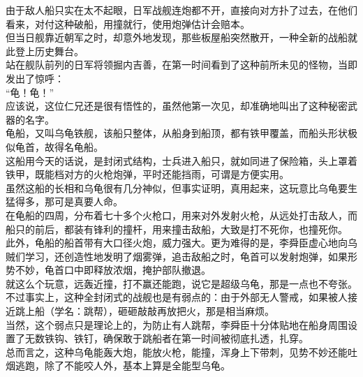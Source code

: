 \begin{multicols}{\theparacolNo}
由于敌人船只实在太不起眼，日军战舰连炮都不开，直接向对方扑了过去，在他们看来，对付这种破船，用撞就行，使用炮弹估计会赔本。\\

但当日舰靠近朝军之时，却意外地发现，那些板屋船突然散开，一种全新的战船就此登上历史舞台。\\

站在舰队前列的日军将领掘内吉善，在第一时间看到了这种前所未见的怪物，当即发出了惊呼：\\

“龟！龟！”\\

应该说，这位仁兄还是很有悟性的，虽然他第一次见，却准确地叫出了这种秘密武器的名字。\\

龟船，又叫乌龟铁舰，该船只整体，从船身到船顶，都有铁甲覆盖，而船头形状极似龟首，故得名龟船。\\

这船用今天的话说，是封闭式结构，士兵进入船只，就如同进了保险箱，头上罩着铁甲，既能档对方的火枪炮弹，平时还能挡雨，可谓是方便实用。\\

虽然这船的长相和乌龟很有几分神似，但事实证明，真用起来，这玩意比乌龟要生猛得多，那可是真要人命。\\

在龟船的四周，分布着七十多个火枪口，用来对外发射火枪，从远处打击敌人，而船只的前后，都装有锋利的撞杆，用来撞击敌船，大致是打不死你，也撞死你。\\

此外，龟船的船首带有大口径火炮，威力强大。更为难得的是，李舜臣虚心地向乌贼们学习，还创造性地发明了烟雾弹，追击敌船之时，龟首可以发射炮弹，如果形势不妙，龟首口中即释放浓烟，掩护部队撤退。\\

就这么个玩意，远轰近撞，打不赢还能跑，说它是超级乌龟，那是一点也不夸张。\\

不过事实上，这种全封闭式的战舰也是有弱点的：由于外部无人警戒，如果被人接近跳上船（学名：跳帮），砸砸敲敲再放把火，那是相当麻烦。\\

当然，这个弱点只是理论上的，为防止有人跳帮，李舜臣十分体贴地在船身周围设置了无数铁钩、铁钉，确保敢于跳船者在第一时间被彻底扎透，扎穿。\\

总而言之，这种乌龟能轰大炮，能放火枪，能撞，浑身上下带刺，见势不妙还能吐烟逃跑，除了不能咬人外，基本上算是全能型乌龟。\\


\end{multicols}
